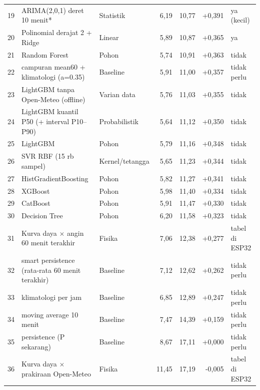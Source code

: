 \begin{small}
\begin{longtable}{@{}r p{6.2cm} p{3.4cm} r r r p{2.6cm}@{}}
19 & ARIMA(2,0,1) deret 10 menit* & Statistik & 6,19 & 10,77 & +0,391 & ya (kecil) \\
20 & Polinomial derajat 2 + Ridge & Linear & 5,89 & 10,87 & +0,365 & ya \\
21 & Random Forest & Pohon & 5,74 & 10,91 & +0,363 & tidak \\
22 & campuran mean60 + klimatologi (a=0.35) & Baseline & 5,91 & 11,00 & +0,357 & tidak perlu \\
23 & LightGBM tanpa Open-Meteo (offline) & Varian data & 5,76 & 11,03 & +0,355 & tidak \\
24 & LightGBM kuantil P50 (+ interval P10–P90) & Probabilistik & 5,64 & 11,12 & +0,350 & tidak \\
25 & LightGBM & Pohon & 5,79 & 11,16 & +0,348 & tidak \\
26 & SVR RBF (15 rb sampel) & Kernel/tetangga & 5,65 & 11,23 & +0,344 & tidak \\
27 & HistGradientBoosting & Pohon & 5,82 & 11,27 & +0,341 & tidak \\
28 & XGBoost & Pohon & 5,98 & 11,40 & +0,334 & tidak \\
29 & CatBoost & Pohon & 5,91 & 11,47 & +0,330 & tidak \\
30 & Decision Tree & Pohon & 6,20 & 11,58 & +0,323 & tidak \\
31 & Kurva daya $\times$ angin 60 menit terakhir & Fisika & 7,06 & 12,38 & +0,277 & tabel di ESP32 \\
32 & smart persistence (rata-rata 60 menit terakhir) & Baseline & 7,12 & 12,62 & +0,262 & tidak perlu \\
33 & klimatologi per jam & Baseline & 6,85 & 12,89 & +0,247 & tidak perlu \\
34 & moving average 10 menit & Baseline & 7,47 & 14,39 & +0,159 & tidak perlu \\
35 & persistence (P sekarang) & Baseline & 8,67 & 17,11 & +0,000 & tidak perlu \\
36 & Kurva daya $\times$ prakiraan Open-Meteo & Fisika & 11,45 & 17,19 & -0,005 & tabel di ESP32 \\
\bottomrule
\end{longtable}
\end{small}